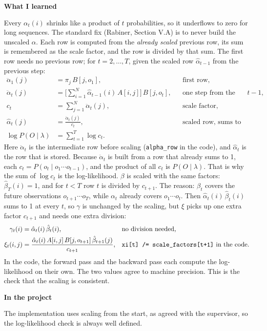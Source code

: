 \documentclass[10pt,a4paper]{article}
\newcommand{\sub}[1]{\vspace{1pt}\textbf{\textcolor{gray!80!black}{#1}}\par}
\begin{document}
\sub{What I learned}
Every $\alpha_t(i)$ shrinks like a product of $t$ probabilities, so it underflows to zero for long sequences. The standard fix (Rabiner, Section V.A) is to never build the unscaled $\alpha$. Each row is computed from the \emph{already scaled} previous row, its sum is remembered as the scale factor, and the row is divided by that sum. The first row needs no previous row; for $t = 2, \ldots, T$, given the scaled row $\hat{\alpha}_{t-1}$ from the previous step:
\begin{align*}
\ddot{\alpha}_1(j) &= \pi_j\, B[j,o_1], && \text{first row,} \\
\ddot{\alpha}_t(j) &= \Big[ \sum_{i=1}^{N} \hat{\alpha}_{t-1}(i)\, A[i,j] \Big]\, B[j,o_t], && \text{one step from the scaled row $t-1$,} \\
c_t &= \sum_{j=1}^{N} \ddot{\alpha}_t(j), && \text{scale factor,} \\
\hat{\alpha}_t(j) &= \frac{\ddot{\alpha}_t(j)}{c_t}, && \text{scaled row, sums to 1,} \\
\log P(O \mid \lambda) &= \sum_{t=1}^{T} \log c_t .
\end{align*}
Here $\ddot{\alpha}_t$ is the intermediate row before scaling (\texttt{alpha\_row} in the code), and $\hat{\alpha}_t$ is the row that is stored. Because $\ddot{\alpha}_t$ is built from a row that already sums to 1, each $c_t = P(o_t \mid o_1 \cdots o_{t-1})$, and the product of all $c_t$ is $P(O \mid \lambda)$. That is why the sum of $\log c_t$ is the log-likelihood.
$\beta$ is scaled with the same factors: $\hat{\beta}_T(i) = 1$, and for $t < T$ row $t$ is divided by $c_{t+1}$. The reason: $\beta_t$ covers the future observations $o_{t+1} \cdots o_T$, while $\alpha_t$ already covers $o_1 \cdots o_t$. Then $\hat{\alpha}_t(i)\, \hat{\beta}_t(i)$ sums to 1 at every $t$, so $\gamma$ is unchanged by the scaling, but $\xi$ picks up one extra factor $c_{t+1}$ and needs one extra division:
\begin{align*}
\gamma_t(i) &= \hat{\alpha}_t(i)\, \hat{\beta}_t(i), && \text{no division needed,} \\
\xi_t(i,j) &= \frac{\hat{\alpha}_t(i)\, A[i,j]\, B[j,o_{t+1}]\, \hat{\beta}_{t+1}(j)}{c_{t+1}}, && \text{\texttt{xi[t] /= scale\_factors[t+1]} in the code.}
\end{align*}
In the code, the forward pass and the backward pass each compute the log-likelihood on their own. The two values agree to machine precision. This is the check that the scaling is consistent.

\sub{In the project}
The implementation uses scaling from the start, as agreed with the supervisor, so the log-likelihood check is always well defined.
\end{document}
